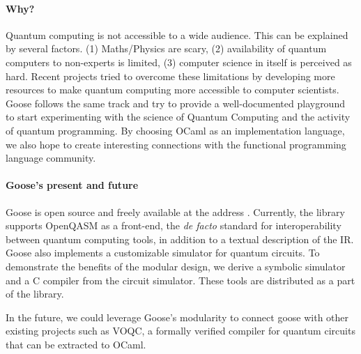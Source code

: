 \documentclass[a4paper]{easychair}
\begin{document}
\paragraph*{Why?} Quantum computing is not accessible to a wide audience. This can be explained by several factors. 
 (1) Maths/Physics are scary, 
(2) availability of quantum computers to non-experts is limited, (3) computer science in itself is perceived as hard.
Recent projects \cite{} tried to overcome these limitations by developing more resources to make quantum computing more accessible to computer scientists. 
 Goose follows the same track and try to provide a well-documented playground to start experimenting with the science of Quantum Computing and the activity of quantum programming. 
By choosing OCaml as an implementation language, we also hope to create interesting connections with the functional programming language community.

\paragraph*{Goose's present and future} Goose is open source and freely available at the address \url{}.
Currently, the library supports OpenQASM as a front-end, the \textit{de facto} standard for interoperability between quantum computing tools, in addition to a textual description of the IR. Goose also implements a customizable simulator for quantum circuits. To demonstrate the benefits of the modular design, we derive a symbolic simulator and a C compiler from the circuit simulator. These tools are distributed as a part of the library.

In the future, we could leverage Goose's modularity to connect goose with other existing projects such as VOQC, a formally verified compiler for quantum circuits that can be extracted to OCaml.





\end{document}
